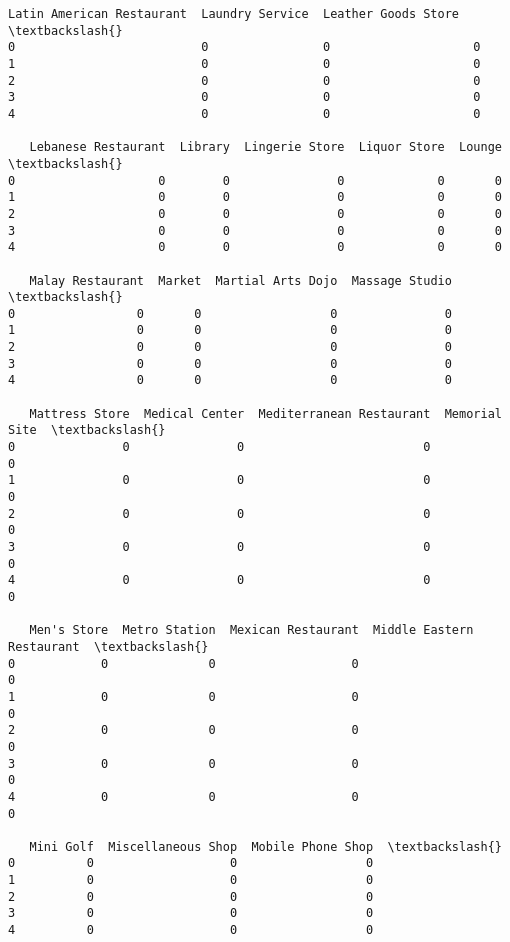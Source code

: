\documentclass[11pt]{article}
\begin{document}
\begin{tcolorbox}[breakable, size=fbox, boxrule=.5pt, pad at break*=1mm, opacityfill=0]
\begin{Verbatim}[commandchars=\\\{\}]
   Latin American Restaurant  Laundry Service  Leather Goods Store  \textbackslash{}
0                          0                0                    0
1                          0                0                    0
2                          0                0                    0
3                          0                0                    0
4                          0                0                    0

   Lebanese Restaurant  Library  Lingerie Store  Liquor Store  Lounge  \textbackslash{}
0                    0        0               0             0       0
1                    0        0               0             0       0
2                    0        0               0             0       0
3                    0        0               0             0       0
4                    0        0               0             0       0

   Malay Restaurant  Market  Martial Arts Dojo  Massage Studio  \textbackslash{}
0                 0       0                  0               0
1                 0       0                  0               0
2                 0       0                  0               0
3                 0       0                  0               0
4                 0       0                  0               0

   Mattress Store  Medical Center  Mediterranean Restaurant  Memorial Site  \textbackslash{}
0               0               0                         0              0
1               0               0                         0              0
2               0               0                         0              0
3               0               0                         0              0
4               0               0                         0              0

   Men's Store  Metro Station  Mexican Restaurant  Middle Eastern Restaurant  \textbackslash{}
0            0              0                   0                          0
1            0              0                   0                          0
2            0              0                   0                          0
3            0              0                   0                          0
4            0              0                   0                          0

   Mini Golf  Miscellaneous Shop  Mobile Phone Shop  \textbackslash{}
0          0                   0                  0
1          0                   0                  0
2          0                   0                  0
3          0                   0                  0
4          0                   0                  0


\end{Verbatim}
\end{tcolorbox}
\end{document}
